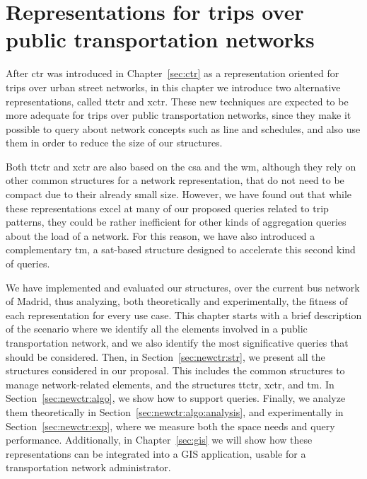 \chapter{Representations for trips over public transportation networks}
\label{sec:newctr}

	After \gls{ctr} was introduced in Chapter~\ref{sec:ctr} as a representation oriented for trips over urban street networks, in this chapter we introduce two alternative representations, called \acrfull{ttctr} and \acrfull{xctr}. These new techniques are expected to be more adequate for trips over public transportation networks, since they make it possible to query about network concepts such as line and schedules, and also use them in order to reduce the size of our structures.
	
	Both \gls{ttctr} and \gls{xctr} are also based on the \gls{csa}  and the \gls{wm}, although they rely on other common structures for a network representation, that do not need to be compact due to their already small size. However, we have found out that while these representations excel at many of our proposed queries related to trip patterns, they could be rather inefficient for other kinds of aggregation queries about the load of a network. For this reason, we have also introduced a complementary \acrfull{tm}, a \gls{sat}-based structure designed to accelerate this second kind of queries.
	
	We have implemented and evaluated our structures, over the current bus network of Madrid, thus analyzing, both theoretically and experimentally, the fitness of each representation for every use case. This chapter starts with a brief description of the scenario where we identify all the elements involved in a public transportation network, and we also identify the most significative queries that should be considered. Then, in Section~\ref{sec:newctr:str}, we present all the structures considered in our proposal. This includes the common structures to manage \mbox{network-related} elements, and the structures \gls{ttctr}, \gls{xctr}, and \gls{tm}. In Section~\ref{sec:newctr:algo}, we show how to support queries. Finally, we analyze them theoretically in Section~\ref{sec:newctr:algo:analysis}, and experimentally in Section~\ref{sec:newctr:exp}, where we measure both the space needs and query performance. Additionally, in Chapter~\ref{sec:gis} we will show how these representations can be integrated into a GIS application, usable for a transportation network administrator.
	
